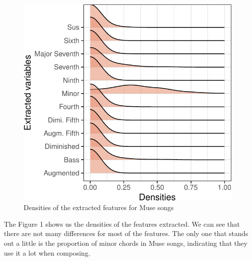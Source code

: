 \documentclass[]{article}
\begin{document}
\begin{figure}[H]

{\centering \includegraphics{report_files/figure-latex/unnamed-chunk-4-1} 

}

\caption{Densities of the extracted features for Muse songs}\label{fig:unnamed-chunk-4}
\end{figure}

The Figure 1 shows us the densities of the features extracted. We can
see that there are not many differences for most of the features. The
only one that stands out a little is the proportion of minor chords in
Muse songs, indicating that they use it a lot when composing.
\end{document}
